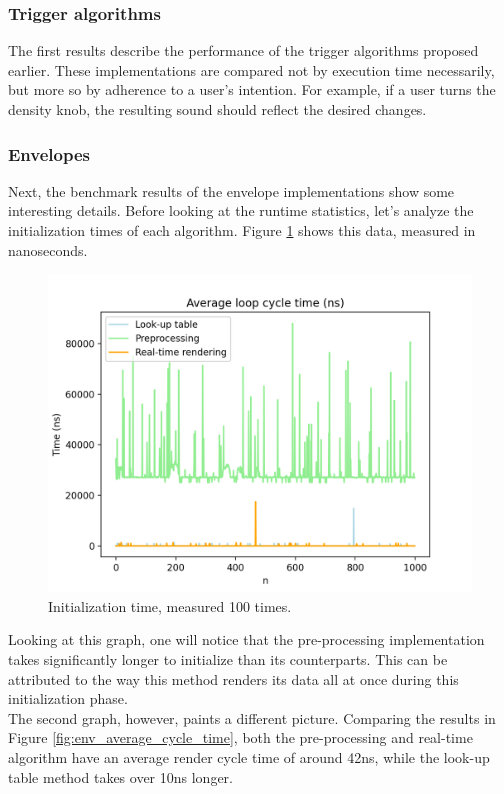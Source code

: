 \documentclass[10pt, twocolumn]{IEEEtran}
\begin{document}
\subsubsection{Trigger algorithms}
The first results describe the performance of the trigger algorithms proposed earlier. These implementations are compared not by execution time necessarily, but more so by adherence to a user's intention. For example, if a user turns the density knob, the resulting sound should reflect the desired changes.

\subsubsection{Envelopes}
Next, the benchmark results of the envelope implementations show some interesting details. Before looking at the runtime statistics, let's analyze the initialization times of each algorithm. Figure \ref{fig:env_init_time} shows this data, measured in nanoseconds.

\begin{figure}[ht!]
	\includegraphics[width=\linewidth]{env_init_time.png}
	\caption{Initialization time, measured 100 times.}
	\label{fig:env_init_time}
\end{figure}

Looking at this graph, one will notice that the pre-processing implementation takes significantly longer to initialize than its counterparts. This can be attributed to the way this method renders its data all at once during this initialization phase.\\
The second graph, however, paints a different picture. Comparing the results in Figure \ref{fig:env_average_cycle_time}, both the pre-processing and real-time algorithm have an average render cycle time of around 42ns, while the look-up table method takes over 10ns longer.
\end{document}
